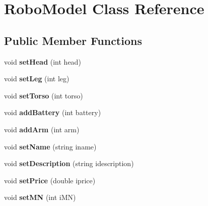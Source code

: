 \hypertarget{classRoboModel}{}\section{Robo\+Model Class Reference}
\label{classRoboModel}
\subsection*{Public Member Functions}
\begin{DoxyCompactItemize}
\item 
void {\bfseries set\+Head} (int head)\hypertarget{classRoboModel_afede39ad73fb51fbfc895b7b37bf0334}{}\label{classRoboModel_afede39ad73fb51fbfc895b7b37bf0334}

\item 
void {\bfseries set\+Leg} (int leg)\hypertarget{classRoboModel_a75d9cf2b1b9315b8bdb3a694becd7e73}{}\label{classRoboModel_a75d9cf2b1b9315b8bdb3a694becd7e73}

\item 
void {\bfseries set\+Torso} (int torso)\hypertarget{classRoboModel_a7a609f8a040d298799940288530e146e}{}\label{classRoboModel_a7a609f8a040d298799940288530e146e}

\item 
void {\bfseries add\+Battery} (int battery)\hypertarget{classRoboModel_aa7a0f295cb296a6eee2a337c07076a3b}{}\label{classRoboModel_aa7a0f295cb296a6eee2a337c07076a3b}

\item 
void {\bfseries add\+Arm} (int arm)\hypertarget{classRoboModel_aab718db5d86837fc44b204ae247374d1}{}\label{classRoboModel_aab718db5d86837fc44b204ae247374d1}

\item 
void {\bfseries set\+Name} (string iname)\hypertarget{classRoboModel_aedb3ffc1c340cdc21be6c5a85ceaf3d8}{}\label{classRoboModel_aedb3ffc1c340cdc21be6c5a85ceaf3d8}

\item 
void {\bfseries set\+Description} (string idescription)\hypertarget{classRoboModel_aaf63fe8d02db31e221e0594f3eb3e2ba}{}\label{classRoboModel_aaf63fe8d02db31e221e0594f3eb3e2ba}

\item 
void {\bfseries set\+Price} (double iprice)\hypertarget{classRoboModel_aed5f6ed45b7298089bc74da68e9ea4a8}{}\label{classRoboModel_aed5f6ed45b7298089bc74da68e9ea4a8}

\item 
void {\bfseries set\+MN} (int i\+MN)\hypertarget{classRoboModel_a5bcd3d3d7d3ee87aa1564eef4e9fb6df}{}\label{classRoboModel_a5bcd3d3d7d3ee87aa1564eef4e9fb6df}


\end{DoxyCompactItemize}
